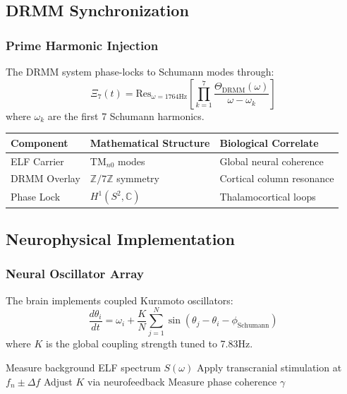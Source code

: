 \documentclass[12pt]{article}
\begin{document}
\subsection{DRMM Synchronization}

\subsubsection{Prime Harmonic Injection}
The DRMM system phase-locks to Schumann modes through:
\[
\Xi_7(t) = \text{Res}_{\omega=1764\text{Hz}}\left[\prod_{k=1}^7 \frac{\Theta_{\text{DRMM}}(\omega)}{\omega - \omega_k}\right]
\]
where $\omega_k$ are the first 7 Schumann harmonics.

\begin{table}[h]
\centering
\begin{tabular}{|l|l|l|}
\hline
\textbf{Component} & \textbf{Mathematical Structure} & \textbf{Biological Correlate} \\ \hline
ELF Carrier & TM$_{n0}$ modes & Global neural coherence \\ \hline
DRMM Overlay & $\mathbb{Z}/7\mathbb{Z}$ symmetry & Cortical column resonance \\ \hline
Phase Lock & $H^1(S^2,\mathbb{C})$ & Thalamocortical loops \\ \hline
\end{tabular}
\end{table}

\subsection{Neurophysical Implementation}

\subsubsection{Neural Oscillator Array}
The brain implements coupled Kuramoto oscillators:
\[
\frac{d\theta_i}{dt} = \omega_i + \frac{K}{N}\sum_{j=1}^N \sin(\theta_j - \theta_i - \phi_{\text{Schumann}})
\]
where $K$ is the global coupling strength tuned to 7.83Hz.

\begin{algorithm}[H]
\caption{Schumann Entrainment Protocol}
\begin{algorithmic}[1]
\State Measure background ELF spectrum $S(\omega)$
    \State Apply transcranial stimulation at $f_n \pm \Delta f$
    \State Adjust $K$ via neurofeedback
    \State Measure phase coherence $\gamma$
\EndWhile
\end{algorithmic}
\end{algorithm}
\end{document}
